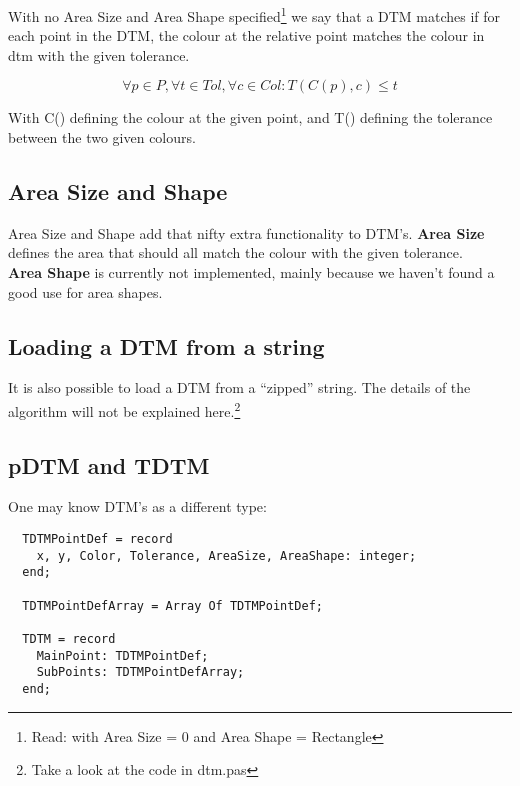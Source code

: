 \documentclass[a4paper, 10pt]{report} %
\begin{document}
With no Area Size and Area Shape specified\footnote{Read: with Area
Size = 0 and Area Shape = Rectangle} we say that a DTM matches if for each
point in the DTM, the colour at the relative point matches the colour in dtm
with the given tolerance.

$$ \forall p \in P, \forall t \in Tol, \forall c \in Col : T(C(p), c) \leq t $$

With C() defining the colour at the given point, and T() defining the tolerance
between the two given colours.

\subsection{Area Size and Shape}

Area Size and Shape add that nifty extra functionality to DTM's.
\textbf{Area Size} defines the area that should all match the colour
with the given tolerance. \\
\textbf{Area Shape} is currently not implemented, mainly because
we haven't found a good use for area shapes.


\subsection{Loading a DTM from a string}

It is also possible to load a DTM from a ``zipped'' string.
The details of the algorithm will not be explained here.\footnote{Take
a look at the code in dtm.pas}

\subsection{pDTM and TDTM}

One may know DTM's as a different type:

\begin{verbatim}
  TDTMPointDef = record
    x, y, Color, Tolerance, AreaSize, AreaShape: integer;
  end;

  TDTMPointDefArray = Array Of TDTMPointDef;

  TDTM = record
    MainPoint: TDTMPointDef;
    SubPoints: TDTMPointDefArray;
  end;            
\end{verbatim}
\end{document}
